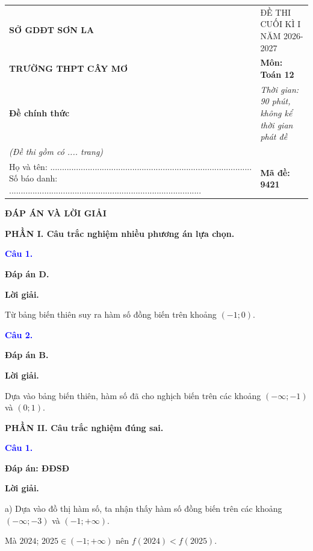 \documentclass[12pt,a4paper]{article}
\begin{document}
\begin{center}
\begin{tabular}{p{}p{}}
\textbf{SỞ GDĐT SƠN LA} & ĐỀ THI CUỐI KÌ I NĂM 2026-2027 \tabularnewline
\textbf{TRƯỜNG THPT CÂY MƠ} & \textbf{Môn: Toán 12} \tabularnewline
\textbf{Đề chính thức} & \textit{Thời gian: 90 phút, không kể thời gian phát đề} \tabularnewline
\textit{(Đề thi gồm có .... trang)} & \tabularnewline
Họ và tên: ...................................................................................... \newline Số báo danh: .................................................................................. & \textbf{Mã đề: 9421} \tabularnewline
\end{tabular}
\end{center}
\vspace{0.5cm}

\begin{center}
{\Large\textbf{ĐÁP ÁN VÀ LỜI GIẢI}}
\end{center}

\noindent\textbf{PHẦN I. Câu trắc nghiệm nhiều phương án lựa chọn.}

\medskip

\noindent\textcolor{blue}{\textbf{Câu 1.}}

\noindent \textbf{Đáp án D.}

\noindent\textbf{Lời giải.}

Từ bảng biến thiên suy ra hàm số đồng biến trên khoảng $(-1;0)$.

\medskip
\noindent\textcolor{blue}{\textbf{Câu 2.}}

\noindent \textbf{Đáp án B.}

\noindent\textbf{Lời giải.}

Dựa vào bảng biến thiên, hàm số đã cho nghịch biến trên các khoảng $(-\infty ;-1)$ và $(0 ; 1)$.

\medskip
\noindent\textbf{PHẦN II. Câu trắc nghiệm đúng sai.}

\medskip

\noindent\textcolor{blue}{\textbf{Câu 1.}}

\noindent \textbf{Đáp án: ĐĐSĐ}

\noindent\textbf{Lời giải.}

a)  
Dựa vào đồ thị hàm số, ta nhận thấy hàm số đồng biến trên các khoảng $(-\infty;-3)$ và $\left(-1;+\infty\right)$.			

Mà $2024$; $2025 \in \left(-1;+\infty\right)$  nên $f(2024)<f(2025)$.			
\end{document}
